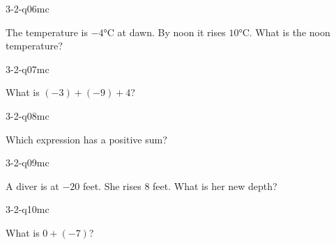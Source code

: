 \begin{practiceQuestion}{3-2-q06}{mc}
\begin{questionText}
The temperature is $-4°$C at dawn. By noon it rises $10°$C. What is the noon temperature?
\end{questionText}
\end{practiceQuestion}

\begin{practiceQuestion}{3-2-q07}{mc}
\begin{questionText}
What is $(-3) + (-9) + 4$?
\end{questionText}
\end{practiceQuestion}

\begin{practiceQuestion}{3-2-q08}{mc}
\begin{questionText}
Which expression has a positive sum?
\end{questionText}
\end{practiceQuestion}

\begin{practiceQuestion}{3-2-q09}{mc}
\begin{questionText}
A diver is at $-20$ feet. She rises $8$ feet. What is her new depth?
\end{questionText}
\end{practiceQuestion}

\begin{practiceQuestion}{3-2-q10}{mc}
\begin{questionText}
What is $0 + (-7)$?
\end{questionText}
\end{practiceQuestion}

